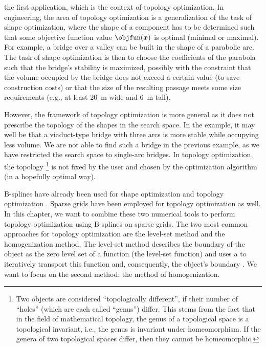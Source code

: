 

the first application, which is the context of topology optimization.
In engineering,
the area of topology optimization is a generalization of the
task of shape optimization, where the shape of a component has to be
determined such that some objective function value $\objfun(\*x)$ is optimal
(minimal or maximal).
For example, a bridge over a valley can be built in the shape of a
parabolic arc.
The task of shape optimization is then to choose the coefficients of the
parabola such that the bridge's stability is maximized,
possibly with the constraint that the volume occupied by the bridge
does not exceed a certain value (to save construction costs) or
that the size of the resulting passage meets some size requirements
(e.g., at least \SI{20}{\meter} wide and \SI{6}{\meter} tall).

However, the framework of topology optimization is more general as
it does not prescribe the topology
of the shapes in the search space.
In the example, it may well be that a viaduct-type bridge with three arcs
is more stable while occupying less volume.
We are not able to find such a bridge in the previous example,
as we have restricted the search space to single-arc bridges.
In topology optimization, the topology%
\footnote{%
  Two objects are considered ``topologically different'',
  if their number of ``holes'' (which are each called ``genus'') differ.
  This stems from the fact that in the field of mathematical topology,
  the genus of a topological space is a topological invariant, i.e.,
  the genus is invariant under homeomorphism.
  If the genera of two topological spaces differ, then they cannot be
  homeomorphic.%
}
is not fixed by the user
and chosen by the optimization algorithm (in a hopefully optimal way).

B-splines have already been used for
shape optimization \cite{Martin16Formoptimierung} and
topology optimization .
Sparse grids have been employed for
topology optimization \cite{Huebner14Mehrdimensionale} as well.
In this chapter, we want to combine these two numerical tools
to perform topology optimization using B-splines on sparse grids.
The two most common approaches for topology optimization are
the level-set method and the homogenization method.
The level-set method describes the boundary of the object
as the zero level set of a function (the level-set function)
and uses a \pde to iteratively transport this function and,
consequently, the object's boundary \cite{Allaire04Topology}.
We want to focus on the second method: the method of homogenization.

